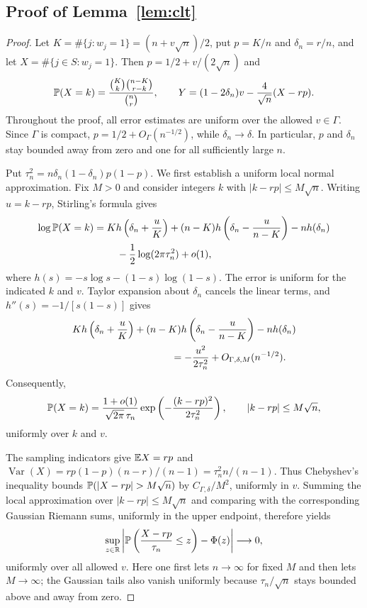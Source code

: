 \documentclass[11pt,reqno]{amsart}
\begin{document}
\subsection{Proof of Lemma~\ref{lem:clt}}

\begin{proof}
Let $K=\#\{j:w_j=1\}=(n+v\sqrt n)/2$, put
$p=K/n$ and $\delta_n=r/n$, and let
$X=\#\{j\in S:w_j=1\}$. Then $p=1/2+v/(2\sqrt n)$ and
\[
    {\mathbb{P}}(X=k)
    =\frac{\binom Kk\binom{n-K}{r-k}}{\binom nr},
    \qquad
    Y=(1-2\delta_n)v-\frac4{\sqrt n}(X-rp).
\]
Throughout the proof, all error estimates are uniform over the
allowed $v\in\Gamma$. Since $\Gamma$ is compact,
$p=1/2+O_\Gamma(n^{-1/2})$, while $\delta_n\to\delta$.
In particular, $p$ and $\delta_n$ stay bounded away from zero and
one for all sufficiently large $n$.

Put $\tau_n^2=n\delta_n(1-\delta_n)p(1-p)$.
We first establish a uniform local normal approximation. Fix $M>0$
and consider integers $k$ with $|k-rp|\le M\sqrt n$.
Writing $u=k-rp$, Stirling's formula gives
\[
\begin{aligned}
    \log{\mathbb{P}}(X=k)
    ={}&K h\left(\delta_n+\frac uK\right)
       +(n-K)h\left(\delta_n-\frac u{n-K}\right)
       -nh(\delta_n)\\
       &\quad-\frac12\log(2\pi\tau_n^2)+o(1),
\end{aligned}
\]
where $h(s)=-s\log s-(1-s)\log(1-s)$. The error is uniform
for the indicated $k$ and $v$. Taylor expansion about $\delta_n$
cancels the linear terms, and $h''(s)=-1/[s(1-s)]$ gives
\[
\begin{aligned}
    &K h\left(\delta_n+\frac uK\right)
       +(n-K)h\left(\delta_n-\frac u{n-K}\right)
       -nh(\delta_n)\\
    &\hspace{35mm}
       =-\frac{u^2}{2\tau_n^2}
        +O_{\Gamma,\delta,M}(n^{-1/2}).
\end{aligned}
\]
Consequently,
\[
    {\mathbb{P}}(X=k)
    =\frac{1+o(1)}{\sqrt{2\pi}\,\tau_n}
       \exp\left(-\frac{(k-rp)^2}{2\tau_n^2}\right),
    \qquad |k-rp|\le M\sqrt n,
\]
uniformly over $k$ and $v$.

The sampling indicators give ${\mathbb{E}} X=rp$ and
$\operatorname{Var}(X)=rp(1-p)(n-r)/(n-1)=\tau_n^2n/(n-1)$.
Thus Chebyshev's inequality bounds
$\bbP(|X-rp|>M\sqrt n)$ by $C_{\Gamma,\delta}/M^2$,
uniformly in $v$. Summing the local approximation over
$|k-rp|\le M\sqrt n$ and comparing with the corresponding
Gaussian Riemann sums, uniformly in the upper endpoint, therefore
yields
\[
    \sup_{z\in{\mathbb{R}}}
    \left|
       {\mathbb{P}}\left(\frac{X-rp}{\tau_n}\le z\right)-\Phi(z)
    \right|\longrightarrow0,
\]
uniformly over all allowed $v$.
Here one first lets $n\to\infty$ for fixed $M$ and then lets
$M\to\infty$; the Gaussian tails also vanish uniformly because
$\tau_n/\sqrt n$ stays bounded above and away from zero.


\end{proof}
\end{document}
